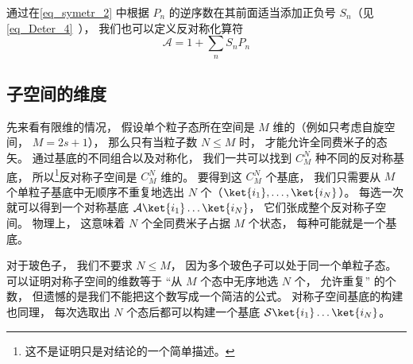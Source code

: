 通过在\autoref{eq_symetr_2} 中根据 $P_n$ 的逆序数在其前面适当添加正负号 $S_n$（见\autoref{eq_Deter_4}~）， 我们也可以定义反对称化算符
\begin{equation}
\mathcal A = 1 + \sum_n S_n P_n
\end{equation}

\subsection{子空间的维度}
先来看有限维的情况， 假设单个粒子态所在空间是 $M$ 维的（例如只考虑自旋空间， $M = 2s+1$）， 那么只有当粒子数 $N \le M$ 时， 才能允许全同费米子的态矢。 通过基底的不同组合以及对称化， 我们一共可以找到 $C_M^N$ 种不同的反对称基底， 所以\footnote{这不是证明只是对结论的一个简单描述。}反对称子空间是 $C_M^N$ 维的。 要得到这 $C_M^N$ 个基底， 我们只需要从 $M$ 个单粒子基底中无顺序不重复地选出 $N$ 个（$\ket{i_1}, \dots, \ket{i_N}$）。 每选一次就可以得到一个对称基底 $\mathcal A \ket{i_1}\dots\ket{i_N}$， 它们张成整个反对称子空间。 物理上， 这意味着 $N$ 个全同费米子占据 $M$ 个状态， 每种可能就是一个基底。

对于玻色子， 我们不要求 $N \le M$， 因为多个玻色子可以处于同一个单粒子态。 可以证明对称子空间的维数等于 “从 $M$ 个态中无序地选 $N$ 个， 允许重复” 的个数， 但遗憾的是我们不能把这个数写成一个简洁的公式。 对称子空间基底的构建也同理， 每次选取出 $N$ 个态后都可以构建一个基底 $\mathcal S \ket{i_1}\dots\ket{i_N}$。
